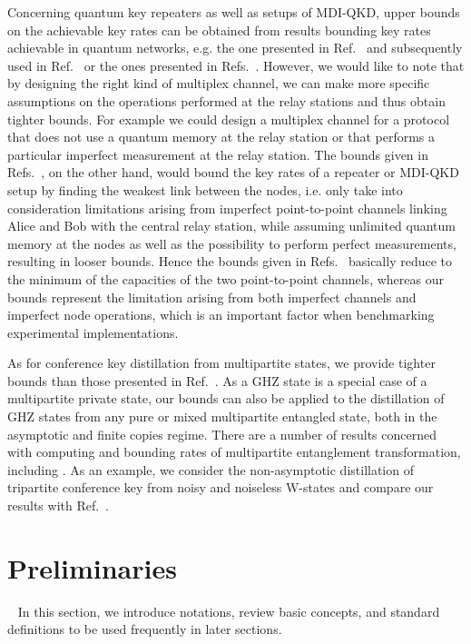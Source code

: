 \documentclass[aps,pra,twocolumn,superscriptaddress,longbibliography]{revtex4-1}
\begin{document}
Concerning quantum key repeaters as well as setups of MDI-QKD, upper bounds on the achievable key rates can be obtained from results bounding key rates achievable in quantum networks, e.g. the one presented in Ref.~\cite{pirandola2019capacities} and subsequently used in Ref.~\cite{van2020extending} or the ones presented in Refs.~\cite{AML16,CM17}. However, we would like to note that by designing the right kind of multiplex channel, we can make more specific assumptions on the operations performed at the relay stations and thus obtain tighter bounds. For example we could design a multiplex channel for a protocol that does not use a quantum memory at the relay station or that performs a particular imperfect measurement at the relay station. The bounds given in Refs.~\cite{pirandola2019capacities,AML16,CM17}, on the other hand, would bound the key rates of a repeater or MDI-QKD setup by finding the weakest link between the nodes, i.e. only take into consideration limitations arising from imperfect point-to-point channels linking Alice and Bob with the central relay station, while assuming unlimited quantum memory at the nodes as well as the possibility to perform perfect measurements, resulting in looser bounds. Hence the bounds given in Refs.~\cite{pirandola2019capacities,AML16,CM17} basically reduce to the minimum of the capacities of the two point-to-point channels, whereas our bounds represent the limitation arising from both imperfect channels and imperfect node operations, which is an important factor when benchmarking experimental implementations. 



As for conference key distillation from multipartite states, we provide tighter bounds than those presented in Ref.~\cite{AH09}. As a GHZ state is a special case of a multipartite private state, our bounds can also be applied to the distillation of GHZ states from any pure or mixed multipartite entangled state, both in the asymptotic and finite copies regime. There are a number of results concerned with computing and bounding rates of multipartite entanglement transformation, including \cite{bennett2000exact,SVW,FL-2007,KT-2010,CCL-2011,vrana2015asymptotic,spee2017entangled,vrana2019distillation,streltsov2020rates}. As an example, we consider the non-asymptotic distillation of tripartite conference key from noisy and noiseless W-states and compare our results with Ref.~\cite{SVW}.


 
\section{Preliminaries}~\label{sec:pre}
In this section, we introduce notations, review basic concepts, and standard definitions to be used frequently in later sections.  
\end{document}
